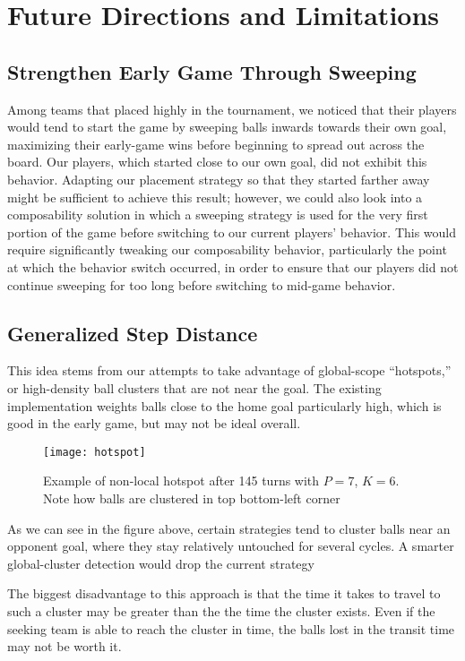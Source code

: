 \documentclass[
10pt, %
letterpaper, %
oneside, %
headinclude,footinclude, %
english
]{article}
\begin{document}
\section{Future Directions and Limitations}

\subsection{Strengthen Early Game Through Sweeping}
Among teams that placed highly in the tournament, we noticed that their players would tend to start the game by sweeping balls inwards towards their own goal, maximizing their early-game wins before beginning to spread out across the board. Our players, which started close to our own goal, did not exhibit this behavior. Adapting our placement strategy so that they started farther away might be sufficient to achieve this result; however, we could also look into a composability solution in which a sweeping strategy is used for the very first portion of the game before switching to our current players' behavior. This would require significantly tweaking our composability behavior, particularly the point at which the behavior switch occurred, in order to ensure that our players did not continue sweeping for too long before switching to mid-game behavior.

\subsection{Generalized Step Distance}
This idea stems from our attempts to take advantage of global-scope “hotspots,” or high-density ball clusters that are not near the goal. The existing implementation weights balls close to the home goal particularly high, which is good in the early game, but may not be ideal overall. 

\begin{figure}[h]
\centering 
\texttt{[image: hotspot]} 
\caption[Example of non-local hotspot]{Example of non-local hotspot after 145 turns with $P=7$, $K=6$. Note how balls are clustered in top bottom-left corner}
\label{fig:gallery2} 
\end{figure}

As we can see in the figure above, certain strategies tend to cluster balls near an opponent goal, where they stay relatively untouched for several cycles. A smarter global-cluster detection would drop the current strategy 

The biggest disadvantage to this approach is that the time it takes to travel to such a cluster may be greater than the the time the cluster exists. Even if the seeking team is able to reach the cluster in time, the balls lost in the transit time may not be worth it.
\end{document}
